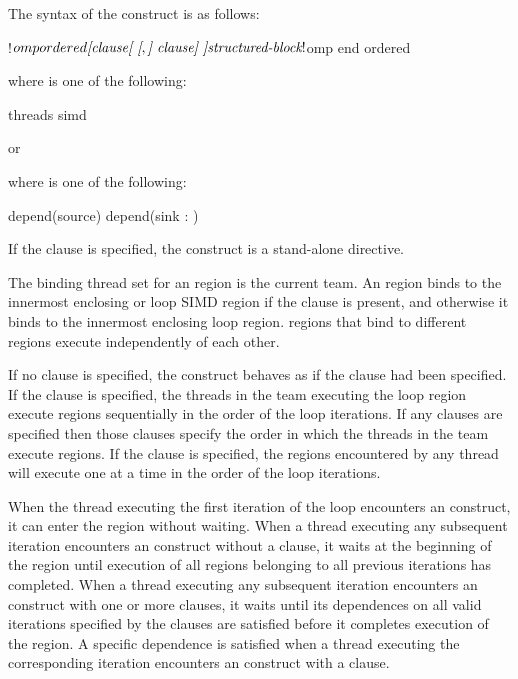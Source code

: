 \begin{fortranspecific}
The syntax of the  construct is as follows:

\begin{ompfPragma}
!$omp ordered \plc{[clause[ [},\plc{] clause] ]}
    \plc{structured-block}
!$omp end ordered
\end{ompfPragma}

where  is one of the following:
\begin{indentedcodelist}
threads
simd
\end{indentedcodelist}

or


where  is one of the following:
\begin{indentedcodelist}
depend(source)
depend(sink : )
\end{indentedcodelist}
\end{fortranspecific}

If the  clause is specified, the  construct is a stand-alone directive.

\binding
The binding thread set for an  region is the current team. An  region
binds to the innermost enclosing  or loop SIMD region if the
 clause is present, and otherwise it binds to the innermost
enclosing loop region.  regions that bind to different regions
execute independently of each other.

\descr
If no clause is specified, the  construct behaves as if the
 clause had been specified. If the  clause is
specified, the threads in the team executing the loop region execute
 regions sequentially in the order of the loop iterations.
If any  clauses are specified then those clauses specify the
order in which the threads in the team execute  regions. If
the  clause is specified, the  regions encountered by
any thread will execute one at a time in the order of the loop iterations.

When the thread executing the first iteration of the loop encounters an
 construct, it can enter the  region without
waiting. When a thread executing any subsequent iteration encounters an
 construct without a  clause, it waits at the
beginning of the  region until execution of all 
regions belonging to all previous iterations has completed. When a thread
executing any subsequent iteration encounters an  construct with
one or more {} clauses, it waits until its dependences on
all valid iterations specified by the  clauses
are satisfied before it completes execution of the  region.
A specific dependence is satisfied when a thread executing the corresponding
iteration encounters an  construct with a  clause.

